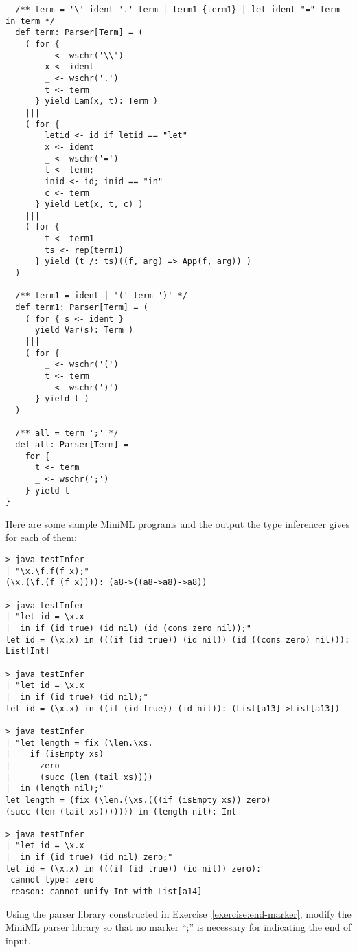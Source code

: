 {\begin{lstlisting}
  /** term = '\' ident '.' term | term1 {term1} | let ident "=" term in term */
  def term: Parser[Term] = (
    ( for {
        _ <- wschr('\\')
        x <- ident
        _ <- wschr('.')
        t <- term
      } yield Lam(x, t): Term )
    |||
    ( for {
        letid <- id if letid == "let"
        x <- ident
        _ <- wschr('=')
        t <- term; 
        inid <- id; inid == "in"
        c <- term
      } yield Let(x, t, c) )
    |||
    ( for {
        t <- term1
        ts <- rep(term1)
      } yield (t /: ts)((f, arg) => App(f, arg)) )
  )     

  /** term1 = ident | '(' term ')' */
  def term1: Parser[Term] = (
    ( for { s <- ident }
      yield Var(s): Term )
    |||
    ( for {
        _ <- wschr('(')
        t <- term
        _ <- wschr(')')
      } yield t )
  )

  /** all = term ';' */
  def all: Parser[Term] = 
    for {
      t <- term
      _ <- wschr(';')
    } yield t
}
\end{lstlisting}
Here are some sample MiniML programs and the output the type inferencer gives for each of them:
\begin{lstlisting}
> java testInfer
| "\x.\f.f(f x);"
(\x.(\f.(f (f x)))): (a8->((a8->a8)->a8))

> java testInfer 
| "let id = \x.x  
|  in if (id true) (id nil) (id (cons zero nil));"
let id = (\x.x) in (((if (id true)) (id nil)) (id ((cons zero) nil))): List[Int]

> java testInfer
| "let id = \x.x 
|  in if (id true) (id nil);"
let id = (\x.x) in ((if (id true)) (id nil)): (List[a13]->List[a13])

> java testInfer
| "let length = fix (\len.\xs.
|    if (isEmpty xs) 
|      zero 
|      (succ (len (tail xs))))
|  in (length nil);"
let length = (fix (\len.(\xs.(((if (isEmpty xs)) zero) 
(succ (len (tail xs))))))) in (length nil): Int

> java testInfer 
| "let id = \x.x 
|  in if (id true) (id nil) zero;"
let id = (\x.x) in (((if (id true)) (id nil)) zero): 
 cannot type: zero
 reason: cannot unify Int with List[a14]
\end{lstlisting}

\begin{exercise}\label{exercise:hm-parse} Using the parser library constructed in
Exercise~\ref{exercise:end-marker}, modify the MiniML parser library
so that no marker ``;'' is necessary for indicating the end of input.
\end{exercise}
}

